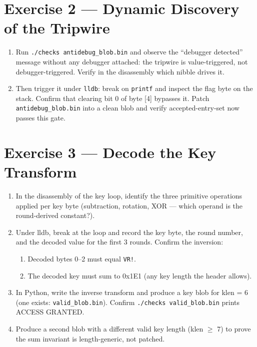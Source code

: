 \documentclass[12pt]{Training}
\begin{document}
\section*{Exercise 2 --- Dynamic Discovery of the Tripwire}
\begin{enumerate}
    \item Run \lstinline{./checks antidebug_blob.bin} and observe the ``debugger detected'' message without any debugger attached: the tripwire is value-triggered, not debugger-triggered. Verify in the disassembly which nibble drives it.
    \item Then trigger it under \lstinline{lldb}: break on \lstinline{printf} and inspect the flag byte on the stack. Confirm that clearing bit 0 of byte [4] bypasses it. Patch \lstinline{antidebug_blob.bin} into a clean blob and verify accepted-entry-set now passes this gate.
\end{enumerate}

\section*{Exercise 3 --- Decode the Key Transform}
\begin{enumerate}
    \item In the disassembly of the key loop, identify the three primitive operations applied per key byte (subtraction, rotation, XOR --- which operand is the round-derived constant?).
    \item Under lldb, break at the loop and record the key byte, the round number, and the decoded value for the first 3 rounds. Confirm the inversion:
        \begin{enumerate}
            \item Decoded bytes 0--2 must equal \lstinline{VR!}.
            \item The decoded key must sum to 0x1E1 (any key length the header allows).
        \end{enumerate}
    \item In Python, write the inverse transform and produce a key blob for klen = 6 (one exists: \lstinline{valid_blob.bin}). Confirm \lstinline{./checks valid_blob.bin} prints ACCESS GRANTED.
    \item Produce a second blob with a different valid key length (klen $\geq$ 7) to prove the sum invariant is length-generic, not patched.
\end{enumerate}
\end{document}
